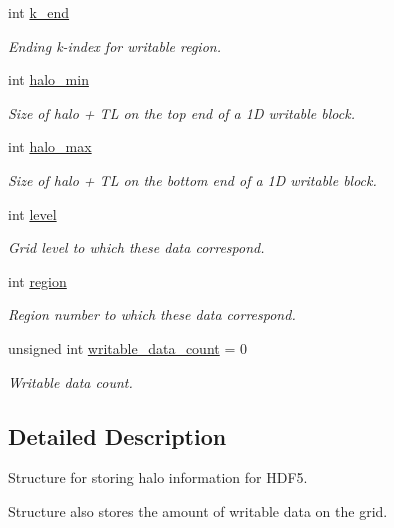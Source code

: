 \begin{DoxyCompactItemize}
int \hyperlink{struct_mpi_manager_1_1phdf5__struct_a2490c17798ca6cf4db002fa521f170c0}{k\+\_\+end}
\begin{DoxyCompactList}\small\item\em Ending k-\/index for writable region. \end{DoxyCompactList}\item 
int \hyperlink{struct_mpi_manager_1_1phdf5__struct_a1ea3307d7dac34273ee8a7b1014273fe}{halo\+\_\+min}
\begin{DoxyCompactList}\small\item\em Size of halo + TL on the top end of a 1D writable block. \end{DoxyCompactList}\item 
int \hyperlink{struct_mpi_manager_1_1phdf5__struct_af6509514433ef18c04217b54ce4614a0}{halo\+\_\+max}
\begin{DoxyCompactList}\small\item\em Size of halo + TL on the bottom end of a 1D writable block. \end{DoxyCompactList}\item 
int \hyperlink{struct_mpi_manager_1_1phdf5__struct_aa3f8cc807724b61ef3a37509f71100ab}{level}
\begin{DoxyCompactList}\small\item\em Grid level to which these data correspond. \end{DoxyCompactList}\item 
int \hyperlink{struct_mpi_manager_1_1phdf5__struct_a1a9978693d5b50cb83b8ccc78fb23a6d}{region}
\begin{DoxyCompactList}\small\item\em Region number to which these data correspond. \end{DoxyCompactList}\item 
unsigned int \hyperlink{struct_mpi_manager_1_1phdf5__struct_a5b487966cec847dfba96a869e9adb7f0}{writable\+\_\+data\+\_\+count} = 0
\begin{DoxyCompactList}\small\item\em Writable data count. \end{DoxyCompactList}\end{DoxyCompactItemize}


\subsection{Detailed Description}
Structure for storing halo information for H\+D\+F5. 

Structure also stores the amount of writable data on the grid. 


